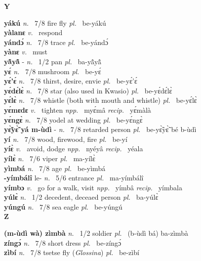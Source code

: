 \medskip
\noindent \large {\bfseries Y}\normalsize\\
\medskip

\noindent
{\bfseries yákú}  {\itshape n.~} 7/8 fire fly {\itshape pl.~} be-yákú    \\ 
{\bfseries yàlanɛ}  {\itshape v.~} respond    \\ 
{\bfseries yándɔ́}  {\itshape n.~} 7/8 trace {\itshape pl.~} be-yándɔ́    \\ 
{\bfseries yànɛ}  {\itshape v.~} must    \\ 
{\bfseries yã̂yã̂} - {\itshape n.~} 1/2 pan {\itshape pl.~} ba-yã̂yã̂    \\ 
{\bfseries yɛ́}  {\itshape n.~} 7/8 mushroom  {\itshape pl.~} be-yɛ́    \\ 
{\bfseries yɛ́'ɛ́}  {\itshape n.~} 7/8 thirst, desire, envie {\itshape pl.~} be-yɛ́'ɛ́    \\ 
{\bfseries yɛ́dɛ́lɛ̀}  {\itshape n.~} 7/8 star (also used in Kwasio) {\itshape pl.~} be-yɛ́dɛ́lɛ̀    \\ 
{\bfseries yɛ́lɛ̀}  {\itshape n.~} 7/8 whistle (both with mouth and whistle) {\itshape pl.~} be-yɛ́lɛ̀    \\ 
{\bfseries yɛ́mɛdɛ}  {\itshape v.~} tighten   {\itshape npp.~} myɛ́mâ {\itshape recip.~} yɛ́màlà  \\ 
{\bfseries yɛ́ngɛ̀}  {\itshape n.~} 7/8 yodel at wedding {\itshape pl.~} be-yɛ́ngɛ̀    \\ 
{\bfseries yɛ̃̀yɛ̃̀ yá m-ùdì} - {\itshape n.~} 7/8 retarded person {\itshape pl.~} be-yɛ̃̀yɛ̃̀ bé b-ùdì    \\ 
{\bfseries yí}  {\itshape n.~} 7/8 wood, firewood, fire {\itshape pl.~} be-yí    \\ 
{\bfseries yíɛ̀}  {\itshape v.~} avoid, dodge   {\itshape npp.~} nyéyâ {\itshape recip.~} yéala  \\ 
{\bfseries yílɛ̀}  {\itshape n.~} 7/6 viper {\itshape pl.~} ma-yílɛ̀    \\ 
{\bfseries yìmbá}  {\itshape n.~} 7/8 age {\itshape pl.~} be-yìmbá    \\ 
{\bfseries -yímbálî} le- {\itshape n.~} 5/6 entrance {\itshape pl.~} ma-yímbálî    \\ 
{\bfseries yímbɔ}  {\itshape v.~} go for a walk, visit   {\itshape npp.~} yímbâ {\itshape recip.~} yímbala  \\ 
{\bfseries yúlɛ̀}  {\itshape n.~} 1/2 decedent, deceaed person {\itshape pl.~} ba-yúlɛ̀    \\ 
{\bfseries  yúngú}  {\itshape n.~} 7/8 sea eagle {\itshape pl.~} be-yúngú    \\ 


\medskip
\noindent \large {\bfseries Z}\normalsize\\
\medskip

\noindent
{\bfseries (m-ùdì wà) zìmbà} {\itshape n.~} 1/2 soldier {\itshape pl.~} (b-ùdì bá) ba-zìmbà    \\ 
{\bfseries zíngɔ́}  {\itshape n.~} 7/8 short dress {\itshape pl.~} be-zíngɔ́    \\ 
{\bfseries zìbí}  {\itshape n.~} 7/8 tsetse fly ({\itshape Glossina}) {\itshape pl.~} be-zìbí    \\ 

\onecolumn

%